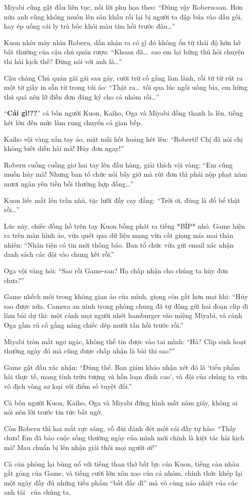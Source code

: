 \documentclass[../main.tex]{subfiles}
\begin{document}
Miyabi cũng gật đầu liên tục, nối lời phụ họa theo: ``Đúng vậy Roberu-san. Hơn nữa anh cũng không muốn lên sân khấu rồi lại bị người ta đập búa vào đầu gối, hay ép uống cái ly trà bốc khói màu tím hồi trước đâu\dots''

Kuon nhíu mày nhìn Roberu, dần nhận ra có gì đó không ổn từ thái độ hớn hở bất thường của cậu chủ quán rượu: ``Khoan đã\dots\ sao em lại hứng thú hỏi chuyện thi hài kịch thế? Đừng nói với anh là\dots''

Cậu chàng Chủ quán gãi gãi sau gáy, cười trừ cố gắng làm lành, rồi từ từ rút ra một tờ giấy in sẵn từ trong túi áo: ``Thật ra\dots\ tối qua lúc ngồi uống bia, em hứng thú quá nên lỡ điền đơn đăng ký cho cả nhóm rồi\dots''

``\textbf{Cái gì!??}'' cả bốn người Kuon, Kaiho, Oga và Miyabi đồng thanh la lên, tiếng hét lớn đến mức làm rung chuyển cả gian bếp.

Kaiho vội vàng xắn tay áo, mặt mũi hốt hoảng hét lên: ``Roberti! Chị đã nói chị không biết diễn hài mà! Hủy đơn ngay!''

Roberu cuống cuồng giơ hai tay lên đầu hàng, giải thích vội vàng: ``Em cũng muốn hủy mà! Nhưng ban tổ chức nói bây giờ mà rút đơn thì phải nộp phạt năm mươi ngàn yên tiền bồi thường hợp đồng\dots''

Kuon liếc mắt lên trần nhà, tặc lưỡi đầy cay đắng: ``Trời ơi, đúng là đổ bể thật rồi\dots''

Lúc này, chiếc đồng hồ trên tay Kuon bỗng phát ra tiếng *BÍP* nhỏ. Game hiện ra trên màn hình ảo, vừa quét qua dữ liệu mạng vừa cất giọng mỉa mai thản nhiên: ``Nhân tiện có tin mới thông báo. Ban tổ chức vừa gửi email xác nhận danh sách các đội vào chung kết rồi.''

Oga vội vàng hỏi: ``Sao rồi Game-san? Họ chấp nhận cho chúng ta hủy đơn chưa?''

Game nhếch môi trong không gian ảo của mình, giọng còn gắt hơn mọi khi: ``Hủy sao được nữa. Camera an ninh trong phòng chung đã tự động gửi hai đoạn clip đi làm bài dự thi: một cảnh mọi người nhét hamburger vào miệng Miyabi, và cảnh Oga gầm rú cố gắng nâng chiếc dép mười tấn hồi trước rồi.''

Miyabi tròn mắt ngơ ngác, không thể tin được vào tai mình: ``Hả? Clip sinh hoạt thường ngày đó mà cũng được chấp nhận là bài thi sao?''

Game gật đầu xác nhận: ``Đúng thế. Ban giám khảo nhận xét đó là `tiểu phẩm hài thực tế, mang tính trừu tượng và hỗn loạn đỉnh cao', và đội của chúng ta vừa vô địch vòng sơ loại với điểm số tuyệt đối.''

Cả bốn người Kuon, Kaiho, Oga và Miyabi đứng hình mất năm giây, không ai nói nên lời trước tin tức bất ngờ.

Còn Roberu thì hai mắt rực sáng, vỗ đùi đánh đét một cái đầy tự hào: ``Thấy chưa! Em đã bảo cuộc sống thường ngày của mình mới chính là kiệt tác hài kịch mà! Mau chuẩn bị lên nhận giải thôi mọi người ơi!''

Cả căn phòng lại bùng nổ với tiếng than thở bất lực của Kuon, tiếng càu nhàu gắt gỏng của Game, và tiếng cười lớn xôn xao của cả nhóm, chính thức khép lại một ngày đầy đủ những tiểu phẩm ``bất đắc dĩ'' mà vô cùng náo nhiệt của các anh tài \hls\ của chúng ta.
\end{document}
